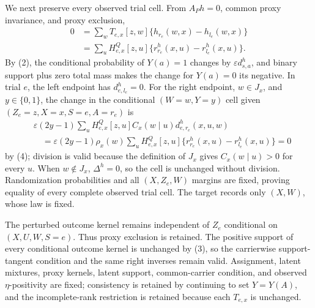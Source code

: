 We next preserve every observed trial cell.  From \(A_Ph=0\), common proxy invariance, and proxy exclusion,
\[
\begin{aligned}
0
&=\sum_wT_{e,x}[z,w]\{h_{r_e}(w,x)-h_{l_e}(w,x)\}\\
&=\sum_uH^Q_{e,x}[z,u]\{r^h_{r_e}(x,u)-r^h_{l_e}(x,u)\}.
\end{aligned}
\tag{4}
\]
By (2), the conditional probability of \(Y(a)=1\) changes by \(\varepsilon d^h_{s,a}\), and binary support plus zero total mass makes the change for \(Y(a)=0\) its negative.  In trial \(e\), the left endpoint has \(d^h_{e,l_e}=0\).  For the right endpoint, \(w\in J_x\), and \(y\in\{0,1\}\), the change in the conditional \((W=w,Y=y)\) cell given \((Z_e=z,X=x,S=e,A=r_e)\) is
\[
\begin{aligned}
&\varepsilon(2y-1)\sum_uH^Q_{e,x}[z,u]C_x(w\mid u)d^h_{e,r_e}(x,u,w)\\
&\quad=\varepsilon(2y-1)\rho_x(w)
\sum_uH^Q_{e,x}[z,u]\{r^h_{r_e}(x,u)-r^h_{l_e}(x,u)\}=0
\end{aligned}
\tag{5}
\]
by (4); division is valid because the definition of \(J_x\) gives \(C_x(w\mid u)>0\) for every \(u\).  When \(w\notin J_x\), \(\Delta^h=0\), so the cell is unchanged without division.  Randomization probabilities and all \((X,Z_e,W)\) margins are fixed, proving equality of every complete observed trial cell.  The target records only \((X,W)\), whose law is fixed.

The perturbed outcome kernel remains independent of \(Z_e\) conditional on \((X,U,W,S=e)\).  Thus proxy exclusion is retained.  The positive support of every conditional outcome kernel is unchanged by (3), so the carrierwise support-tangent condition and the same right inverses remain valid.  Assignment, latent mixtures, proxy kernels, latent support, common-carrier condition, and observed \(\eta\)-positivity are fixed; consistency is retained by continuing to set \(Y=Y(A)\), and the incomplete-rank restriction is retained because each \(T_{e,x}\) is unchanged.

